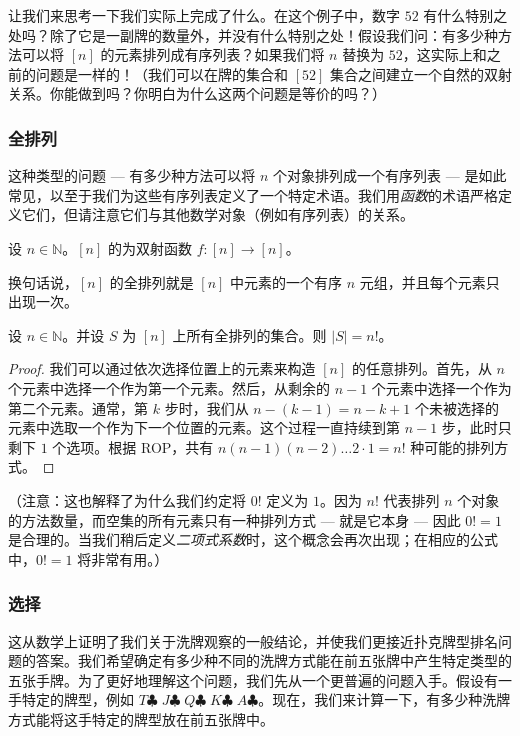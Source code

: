 让我们来思考一下我们实际上完成了什么。在这个例子中，数字 $52$ 有什么特别之处吗？除了它是一副牌的数量外，并没有什么特别之处！假设我们问：有多少种方法可以将 $[n]$ 的元素排列成有序列表？如果我们将 $n$ 替换为 $52$，这实际上和之前的问题是一样的！（我们可以在牌的集合和 $[52]$ 集合之间建立一个自然的双射关系。你能做到吗？你明白为什么这两个问题是等价的吗？）

\subsubsection*{全排列}

这种类型的问题 --- 有多少种方法可以将 $n$ 个对象排列成一个有序列表 --- 是如此常见，以至于我们为这些有序列表定义了一个特定术语。我们用\emph{函数}的术语严格定义它们，但请注意它们与其他数学对象（例如有序列表）的关系。

\begin{definition}
    设 $n \in \mathbb{N}$。$[n]$ 的为双射函数 $f : [n] \to [n]$。

    换句话说，$[n]$ 的全排列就是 $[n]$ 中元素的一个有序 $n$ 元组，并且每个元素只出现一次。
\end{definition}

\begin{proposition} \label{prop:proposition8.2.14}
    设 $n \in \mathbb{N}$。并设 $S$ 为 $[n]$ 上所有全排列的集合。则 $|S| = n!$。
\end{proposition}

\begin{proof}
    我们可以通过依次选择位置上的元素来构造 $[n]$ 的任意排列。首先，从 $n$ 个元素中选择一个作为第一个元素。然后，从剩余的 $n-1$ 个元素中选择一个作为第二个元素。通常，第 $k$ 步时，我们从 $n-(k-1) = n-k+1$ 个未被选择的元素中选取一个作为下一个位置的元素。这个过程一直持续到第 $n-1$ 步，此时只剩下 $1$ 个选项。根据 ROP，共有 $n(n-1)(n-2) \dots 2 \cdot 1 = n!$ 种可能的排列方式。
\end{proof}
（注意：这也解释了为什么我们约定将 $0!$ 定义为 $1$。因为 $n!$ 代表排列 $n$ 个对象的方法数量，而空集的所有元素只有一种排列方式 --- 就是它本身 --- 因此 $0! = 1$ 是合理的。当我们稍后定义\emph{二项式系数}时，这个概念会再次出现；在相应的公式中，$0! = 1$ 将非常有用。）

\subsubsection*{选择}

这从数学上证明了我们关于洗牌观察的一般结论，并使我们更接近扑克牌型排名问题的答案。我们希望确定有多少种不同的洗牌方式能在前五张牌中产生特定类型的五张手牌。为了更好地理解这个问题，我们先从一个更普遍的问题入手。假设有一手特定的牌型，例如 $T\clubsuit\; J\clubsuit\; Q\clubsuit\; K\clubsuit\; A\clubsuit$。现在，我们来计算一下，有多少种洗牌方式能将这手特定的牌型放在前五张牌中。

